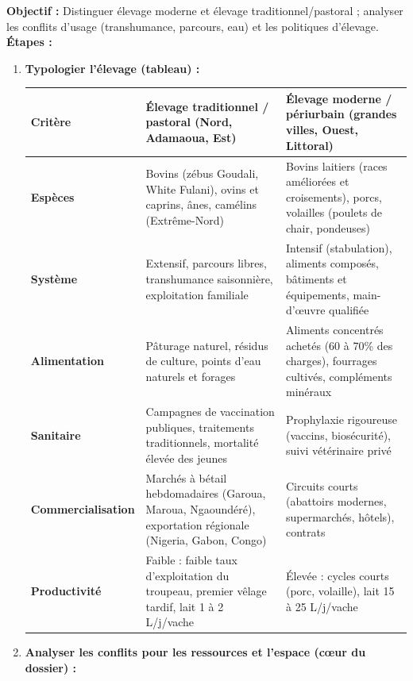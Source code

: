 \documentclass[11pt]{article}
\begin{document}
\begin{methode}
\textbf{Objectif :} Distinguer élevage moderne et élevage traditionnel/pastoral ; analyser les conflits d'usage (transhumance, parcours, eau) et les politiques d'élevage.
\textbf{Étapes :}
\begin{enumerate}
    \item \textbf{Typologier l'élevage (tableau) :}
    \begin{center}
    \begin{tabularx}{\linewidth}{|l|X|X|}\hline
    \textbf{Critère} & \textbf{Élevage traditionnel / pastoral (Nord, Adamaoua, Est)} & \textbf{Élevage moderne / périurbain (grandes villes, Ouest, Littoral)} \\ \hline
    \textbf{Espèces} & Bovins (zébus Goudali, White Fulani), ovins et caprins, ânes, camélins (Extrême-Nord) & Bovins laitiers (races améliorées et croisements), porcs, volailles (poulets de chair, pondeuses) \\ \hline
    \textbf{Système} & Extensif, parcours libres, transhumance saisonnière, exploitation familiale & Intensif (stabulation), aliments composés, bâtiments et équipements, main-d'œuvre qualifiée \\ \hline
    \textbf{Alimentation} & Pâturage naturel, résidus de culture, points d'eau naturels et forages & Aliments concentrés achetés (60 à 70\% des charges), fourrages cultivés, compléments minéraux \\ \hline
    \textbf{Sanitaire} & Campagnes de vaccination publiques, traitements traditionnels, mortalité élevée des jeunes & Prophylaxie rigoureuse (vaccins, biosécurité), suivi vétérinaire privé \\ \hline
    \textbf{Commercialisation} & Marchés à bétail hebdomadaires (Garoua, Maroua, Ngaoundéré), exportation régionale (Nigeria, Gabon, Congo) & Circuits courts (abattoirs modernes, supermarchés, hôtels), contrats \\ \hline
    \textbf{Productivité} & Faible : faible taux d'exploitation du troupeau, premier vêlage tardif, lait 1 à 2 L/j/vache & Élevée : cycles courts (porc, volaille), lait 15 à 25 L/j/vache \\ \hline
    \end{tabularx}
    \end{center}
    \item \textbf{Analyser les conflits pour les ressources et l'espace (cœur du dossier) :}
    \begin{itemize}

\end{itemize}
\end{enumerate}
\end{methode}
\end{document}
